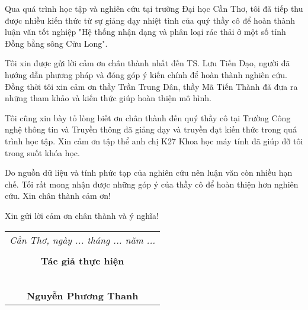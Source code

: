 \documentclass[./thesis.tex]{subfiles}
\begin{document}
{\fontsize{13}{12} \selectfont
Qua quá trình học tập và nghiên cứu tại trường Đại học Cần Thơ, tôi đã tiếp thu được nhiều kiến thức từ sự giảng dạy nhiệt tình của quý thầy cô để hoàn thành luận văn tốt nghiệp "Hệ thống nhận dạng và phân loại rác thải ở một số tỉnh Đồng bằng sông Cửu Long". 

}
\bigskip

{\fontsize{13}{12} \selectfont
Tôi xin được gửi lời cảm ơn chân thành nhất đến TS. Lưu Tiến Đạo, người đã hướng dẫn phương pháp và đóng góp ý kiến chính để hoàn thành nghiên cứu.
Đồng thời tôi xin cảm ơn thầy Trần Trung Dân, thầy Mã Tiến Thành đã đưa ra những tham khảo và kiến thức giúp hoàn thiện mô hình.

}
\bigskip

{\fontsize{13}{12} \selectfont
Tôi cũng xin bày tỏ lòng biết ơn chân thành đến quý thầy cô tại Trường Công nghệ thông tin và Truyền thông đã giảng dạy và truyền đạt kiến thức trong quá trình học tập. Xin cảm ơn tập thể anh chị K27 Khoa học máy tính đã giúp đỡ tôi trong suốt khóa học.

}

\bigskip

{\fontsize{13}{12} \selectfont
Do nguồn dữ liệu và tính phức tạp của nghiên cứu nên luận văn còn nhiều hạn chế. Tối rất mong nhận được những góp ý của thầy cô để hoàn thiện hơn nghiên cứu.
Xin chân thành cảm ơn!

}

{\fontsize{13}{12} \selectfont
Xin gửi lời cảm ơn chân thành và ý nghĩa!

}

{\fontsize{13}{12} \selectfont
\hspace*{\fill}
\begin{tabular}{@{}c@{}} 

\\ \textit{Cần Thơ, ngày ... tháng ... năm ... } \\ \\
\textbf{Tác giả thực hiện}\\ \\
\\
\\
\\
\\
\textbf{Nguyễn Phương Thanh}
\end{tabular}

}
\end{document}
